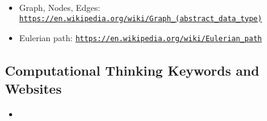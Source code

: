 \documentclass[a4paper,11pt]{report}
\newcommand{\BrochureUrlText}[1]{\texttt{#1}}
\begin{document}
\begin{itemize}
  \item Graph, Nodes, Edges: \href{https://en.wikipedia.org/wiki/Graph_(abstract_data_type)}{\BrochureUrlText{https://en.wikipedia.org/wiki/Graph\_(abstract\_data\_type)}}
  \item Eulerian path: \href{https://en.wikipedia.org/wiki/Eulerian_path}{\BrochureUrlText{https://en.wikipedia.org/wiki/Eulerian\_path}}
\end{itemize}


\subsection*{Computational Thinking Keywords and Websites}

\begin{itemize}
  \item 
\end{itemize}
\end{document}
